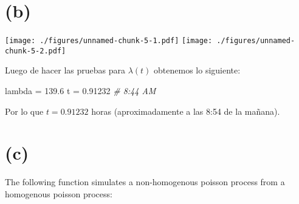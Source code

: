 \documentclass[]{article}
\newenvironment{Shaded}{\begin{snugshade}}{\end{snugshade}}
\newcommand{\CommentTok}[1]{\textcolor[rgb]{0.56,0.35,0.01}{\textit{#1}}}
\newcommand{\FloatTok}[1]{\textcolor[rgb]{0.00,0.00,0.81}{#1}}
\newcommand{\NormalTok}[1]{#1}
\newcommand{\StringTok}[1]{\textcolor[rgb]{0.31,0.60,0.02}{#1}}
\begin{document}
\hypertarget{b}{%
\section{(b)}\label{b}}

\texttt{[image: ./figures/unnamed-chunk-5-1.pdf]}
\texttt{[image: ./figures/unnamed-chunk-5-2.pdf]}

Luego de hacer las pruebas para \(\lambda (t)\) obtenemos lo siguiente:

\begin{Shaded}
\begin{Highlighting}[]
\NormalTok{lambda =}\StringTok{ }\FloatTok{139.6}
\NormalTok{t =}\StringTok{ }\FloatTok{0.91232}
\CommentTok{# 8:44 AM}
\end{Highlighting}
\end{Shaded}

Por lo que \(t = 0.91232\) horas (aproximadamente a las 8:54 de la
mañana).

\hypertarget{c}{%
\section{(c)}\label{c}}

The following function simulates a non-homogenous poisson process from a
homogenous poisson process:
\end{document}
